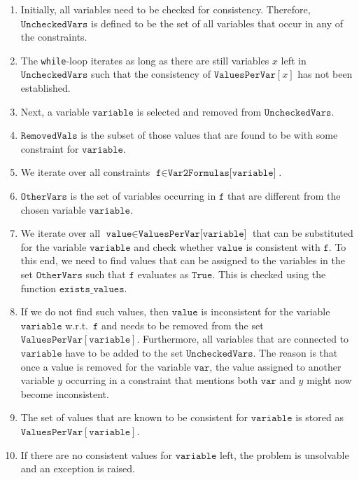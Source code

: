 \begin{enumerate}
\item Initially, all variables need to be checked for consistency.  Therefore, $\texttt{UncheckedVars}$
      is defined to be the set of all variables that occur in any of the constraints.
\item The \texttt{while}-loop iterates as long as there are still variables $x$ left in $\texttt{UncheckedVars}$
      such that the consistency of $\texttt{ValuesPerVar}[x]$ has not been established.
\item Next, a variable $\texttt{variable}$ is selected and removed from $\texttt{UncheckedVars}$. 
\item $\texttt{RemovedVals}$ is the subset of those values that are found to be  with some
      constraint for $\texttt{variable}$. 
\item We iterate over all constraints $\texttt{f} \in \texttt{Var2Formulas[variable]}$.
\item $\texttt{OtherVars}$ is the set of variables occurring in $\texttt{f}$ that are different from 
      the chosen variable $\texttt{variable}$.
\item We iterate over all $\texttt{value} \in \texttt{ValuesPerVar[variable]}$ that can be substituted for the
      variable $\texttt{variable}$ and check whether $\texttt{value}$ is consistent with $\texttt{f}$.   To
      this end, we need to find values 
      that can be assigned to the variables in the set $\texttt{OtherVars}$ such that $\texttt{f}$ evaluates as
      $\texttt{True}$.  This is checked using the function $\texttt{exists\_values}$.
\item If we do not find such values, then $\texttt{value}$ is inconsistent for the variable
      $\texttt{variable}$ w.r.t.~$\texttt{f}$ and needs to be removed from the set 
      $\texttt{ValuesPerVar}[\texttt{variable}]$.  Furthermore, all variables that are connected to
      $\texttt{variable}$ have to be added to the set $\texttt{UncheckedVars}$.  The reason is that once a
      value is removed for the variable $\texttt{var}$, the value assigned to another variable $y$ occurring in a
      constraint that mentions both $\texttt{var}$ and $y$ might now become inconsistent.
\item The set of values that are known to be consistent for $\texttt{variable}$ is stored as
      $\texttt{ValuesPerVar}[\texttt{variable}]$.
\item If there are no consistent values for $\texttt{variable}$ left, the problem is unsolvable and an exception is
      raised.
\end{enumerate}

